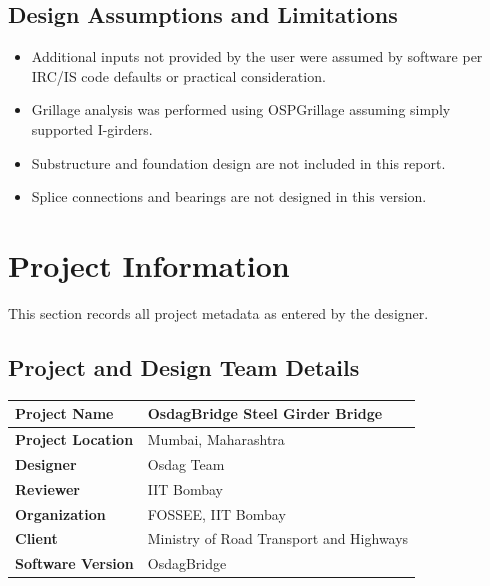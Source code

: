 \documentclass[12pt,a4paper]{report}
\numberwithin{table}{chapter}
\numberwithin{figure}{chapter}
\begin{document}
\section*{Design Assumptions and Limitations}
\label{sec:assumptions}

\begin{itemize}
\item Additional inputs not provided by the user were assumed by software per IRC/IS code defaults or practical consideration.
\item Grillage analysis was performed using OSPGrillage assuming simply supported I-girders.
\item Substructure and foundation design are not included in this report.
\item Splice connections and bearings are not designed in this version.
\end{itemize}

\titleformat{\chapter}[block]{\normalfont\Large\bfseries\centering}{\thechapter}{1em}{}
\titlespacing*{\chapter}{0pt}{-30pt}{10pt}


\chapter{Project Information}

This section records all project metadata as entered by the designer.

\section{Project and Design Team Details}
\label{sec:project-details}

\begin{tabular}{|L{5.5cm}|L{8.5cm}|}
\hline
\textbf{Project Name} & OsdagBridge Steel Girder Bridge \\
\hline
\textbf{Project Location} & Mumbai, Maharashtra \\
\hline
\textbf{Designer} & Osdag Team \\
\hline
\textbf{Reviewer} & IIT Bombay \\
\hline
\textbf{Organization} & FOSSEE, IIT Bombay \\
\hline
\textbf{Client} & Ministry of Road Transport and Highways \\
\hline
\textbf{Software Version} & OsdagBridge \\
\hline
\end{tabular}
\end{document}
